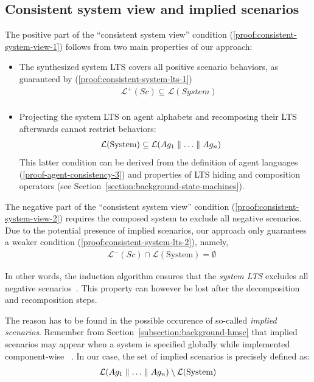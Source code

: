 
\subsection{Consistent system view and implied scenarios\label{subsection:consistent-system-view}}

The positive part of the ``consistent system view'' condition (\ref{proof:consistent-system-view-1}) follows from two main properties of our approach:
\begin{itemize}
\item The synthesized system LTS covers all positive scenario behaviors, as guaranteed by (\ref{proof:consistent-system-lts-1})
\begin{align*}
&\mathcal{L}^+(Sc) \subseteq \mathcal{L}(System)\\
\end{align*}
\item Projecting the system LTS on agent alphabets and recomposing their LTS afterwards cannot restrict behaviors:
\begin{align*}
&\mathcal{L}(\mbox{System}) \subseteq \mathcal{L}(Ag_1 \parallel \ldots \parallel Ag_n)
\end{align*}
This latter condition can be derived from the definition of agent languages (\ref{proof-agent-consistency-3}) and properties of LTS hiding and composition operators (see Section~\ref{section:background-state-machines}).
\end{itemize} 

The negative part of the ``consistent system view'' condition (\ref{proof:consistent-system-view-2}) requires the composed system to exclude all negative scenarios. Due to the potential presence of implied scenarios, our approach only guarantees a weaker condition (\ref{proof:consistent-system-lts-2}), namely,
\begin{align*}
&\mathcal{L}^-(Sc) \cap \mathcal{L}(\mbox{System}) = \emptyset
\end{align*}

In other words, the induction algorithm ensures that the \emph{system LTS} excludes all negative scenarios~\cite{Oncina:1993}. This property can however be lost after the decomposition and recomposition steps.

The reason has to be found in the possible occurence of so-called \emph{implied scenarios}. Remember from Section~\ref{subsection:background-hmsc} that implied scenarios may appear when a system is specified globally while implemented component-wise ~\cite{Alur:2000, Uchitel:2004}. In our case, the set of implied scenarios is precisely defined as:
\begin{align*}
\mathcal{L}(Ag_1 \parallel \ldots \parallel Ag_n) \setminus \mathcal{L}(\mbox{System})
\end{align*}

